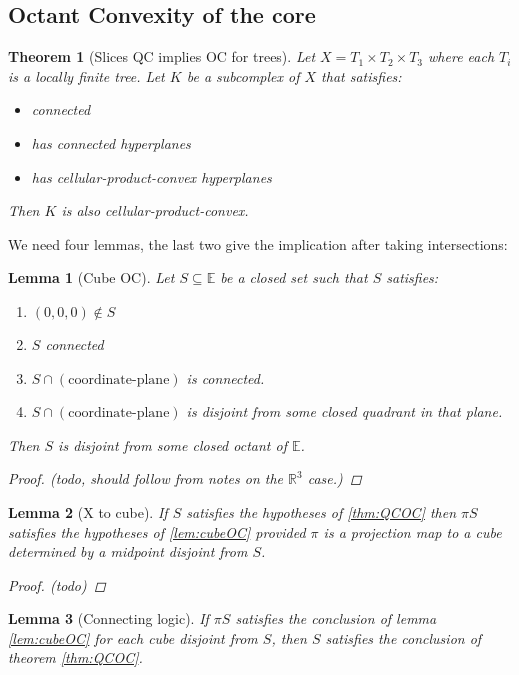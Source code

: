 \documentclass{article}
\theoremstyle{mystyle}
\newtheorem{thm}{Theorem}[section]
\newtheorem{lem}{Lemma}[section]
\theoremstyle{remark}
\begin{document}
\subsection{Octant Convexity of the core}
\begin{thm}
    [\label{thm:QCOC}Slices QC implies OC for trees]
	Let \(X=T_{1} \times T_{2} \times T_{3}\) where each \(T_{i}\) is a locally finite tree. Let \(K\) be a subcomplex of \(X\) that satisfies: 
	\begin{itemize}
		\item connected
		\item has connected hyperplanes
		\item has cellular-product-convex hyperplanes 
	\end{itemize}
Then \(K\) is also cellular-product-convex.
\end{thm}
We need four lemmas, the last two give the implication after taking intersections:

\begin{lem}
	[\label{lem:cubeOC}Cube OC] Let \(S \subseteq \mathbb{E}  \) be a closed set such that \(S\) satisfies: 
	\begin{enumerate}
		\item \((0,0,0) \not\in S\) 
		\item \(S\) connected
		\item \(S \cap (\text{coordinate-plane})\) is connected.
		\item \(S \cap (\text{coordinate-plane})\) is disjoint from some closed quadrant in that plane.
	\end{enumerate}
	Then \(S\) is disjoint from some closed octant of \(\mathbb{E}\). 
	\begin{proof}
		(todo, should follow from notes on the \(\mathbb{R}^{3}\) case.)
	\end{proof}
\end{lem}

\begin{lem}
	[\label{lem:Xtocube}X to cube]
	If \(S\) satisfies the hypotheses of \ref{thm:QCOC} then \(\pi S\) satisfies the hypotheses of \ref{lem:cubeOC} provided \(\pi\) is a projection map to a cube determined by a midpoint disjoint from \(S\).
\begin{proof}
	(todo)	
\end{proof}
\end{lem}

\begin{lem}
	[Connecting logic]
	If \(\pi S\) satisfies the conclusion of lemma \ref{lem:cubeOC} for each cube disjoint from \(S\), then \(S\) satisfies the conclusion of theorem \ref{thm:QCOC}.
\end{lem}
\end{document}
